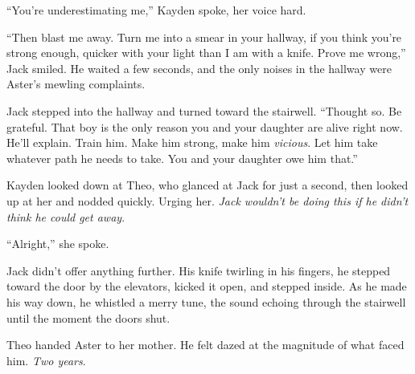 ``You're underestimating me,'' Kayden spoke, her voice hard.



``Then blast me away.  Turn me into a smear in your hallway, if you think you're strong enough, quicker with your light than I am with a knife.  Prove me wrong,'' Jack smiled.  He waited a few seconds, and the only noises in the hallway were Aster's mewling complaints.



Jack stepped into the hallway and turned toward the stairwell.  ``Thought so.  Be grateful.  That boy is the only reason you and your daughter are alive right now.  He'll explain.  Train him.  Make him strong, make him \emph{vicious}.  Let him take whatever path he needs to take.  You and your daughter owe him that.''



Kayden looked down at Theo, who glanced at Jack for just a second, then looked up at her and nodded quickly.  Urging her.  \emph{Jack wouldn't be doing this if he didn't think he could get away}.



``Alright,'' she spoke.



Jack didn't offer anything further.  His knife twirling in his fingers, he stepped toward the door by the elevators, kicked it open, and stepped inside.  As he made his way down, he whistled a merry tune, the sound echoing through the stairwell until the moment the doors shut.



Theo handed Aster to her mother.  He felt dazed at the magnitude of what faced him.  \emph{Two years}.





